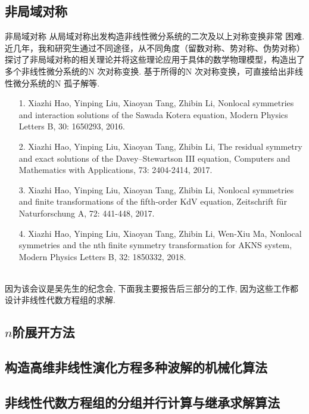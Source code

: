 \documentclass{beamer}
\begin{document}
\subsection{非局域对称}
\begin{frame}{非局域对称}
  从局域对称出发构造非线性微分系统的二次及以上对称变换非常
  困难. 近几年，我和研究生通过不同途径，从不同角度（留数对称、势对称、伪势对称）探讨了非局域对称的相关理论并将这些理论应用于具体的数学物理模型，构造出了多个非线性微分系统的N 次对称变换. 基于所得的N 次对称变换，可直接给出非线性微分系统的N 孤子解等.
  \begin{itemize}
    \item[1.] Xiazhi Hao, Yinping Liu, Xiaoyan Tang, Zhibin Li, Nonlocal symmetries and interaction solutions of the Sawada Kotera equation, Modern Physics Letters B, 30:
    1650293, 2016.
    \item[2.] Xiazhi Hao, Yinping Liu, Xiaoyan Tang, Zhibin Li, The residual symmetry and exact solutions of the Davey–Stewartson III equation, Computers and Mathematics
    with Applications, 73: 2404-2414, 2017.
    \item[3.] Xiazhi Hao, Yinping Liu, Xiaoyan Tang, Zhibin Li, Nonlocal symmetries and finite transformations of the fifth-order KdV equation, Zeitschrift für Naturforschung
    A, 72: 441-448, 2017.
  \end{itemize}
\end{frame}
\begin{frame}
  \begin{itemize}
    \item[4.] Xiazhi Hao, Yinping Liu, Xiaoyan Tang, Zhibin Li, Wen-Xiu Ma, Nonlocal symmetries and the nth finite symmetry transformation for AKNS system, Modern
    Physics Letters B, 32: 1850332, 2018.
  \end{itemize}
\mbox{} \\
    因为该会议是吴先生的纪念会, 下面我主要报告后三部分的工作, 因为这些工作都设计非线性代数方程组的求解. 
\end{frame}

\subsection{$n$阶展开方法}

\subsection{构造高维非线性演化方程多种波解的机械化算法}

\subsection{非线性代数方程组的分组并行计算与继承求解算法}

\end{document}
